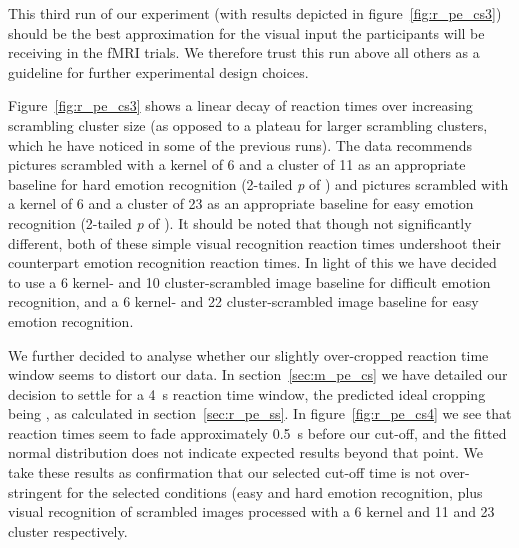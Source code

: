 	    This third run of our experiment (with results depicted in figure~\ref{fig:r_pe_cs3}) should be the best approximation for the visual input the participants will be receiving in the fMRI trials.
	    We therefore trust this run above all others as a guideline for further experimental design choices.
	    
	    Figure~\ref{fig:r_pe_cs3} shows a linear decay of reaction times over increasing scrambling cluster size
	    (as opposed to a plateau for larger scrambling clusters, which he have noticed in some of the previous runs).
	    The data recommends pictures scrambled with a kernel of \SI{6}{\pixel} and a cluster of \SI{11}{\pixel} as an appropriate baseline for hard emotion recognition
	    (2-tailed \textit{p} of )
	    and pictures scrambled with a kernel of \SI{6}{\pixel} and a cluster of \SI{23}{\pixel} as an appropriate baseline for easy emotion recognition
	    (2-tailed \textit{p} of ).
	    It should be noted that though not significantly different, both of these simple visual recognition reaction times undershoot their counterpart emotion recognition reaction times.
	    In light of this we have decided to use a \SI{6}{\pixel} kernel- and \SI{10}{\pixel} cluster-scrambled image baseline for difficult emotion recognition, 
	    and a \SI{6}{\pixel} kernel- and \SI{22}{\pixel} cluster-scrambled image baseline for easy emotion recognition.
	    
	    We further decided to analyse whether our slightly over-cropped reaction time window seems to distort our data.
	    In section~\ref{sec:m_pe_cs} we have detailed our decision to settle for a \SI{4}{\second} reaction time window, the predicted ideal cropping being , as calculated in section~\ref{sec:r_pe_ss}.
	    In figure~\ref{fig:r_pe_cs4} we see that reaction times seem to fade approximately \SI{0.5}{\second} before our cut-off, and the fitted normal distribution does not indicate expected results beyond that point.
	    We take these results as confirmation that our selected cut-off time is not over-stringent for the selected conditions (easy and hard emotion recognition, plus visual recognition of scrambled images processed with a \SI{6}{\pixel} kernel and \SI{11}{\pixel} and \SI{23}{\pixel} cluster respectively.	    
	    

